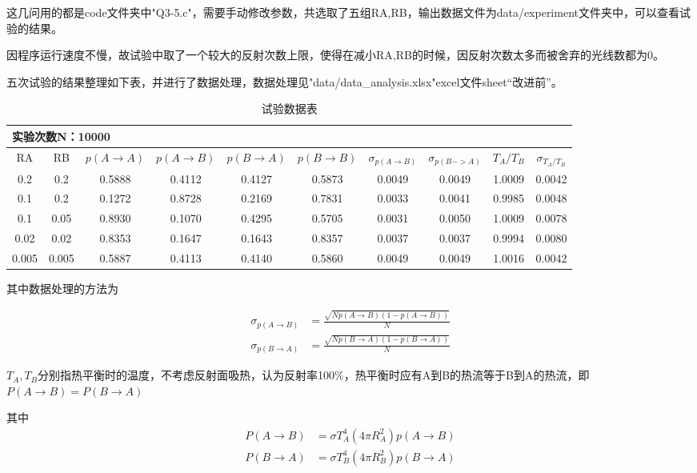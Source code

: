 \documentclass[10pt, a4paper]{article}
\begin{document}
    这几问用的都是code文件夹中"Q3-5.c"，需要手动修改参数，共选取了五组RA,RB，输出数据文件为data/experiment文件夹中，可以查看试验的结果。

    因程序运行速度不慢，故试验中取了一个较大的反射次数上限，使得在减小RA,RB的时候，因反射次数太多而被舍弃的光线数都为0。

    五次试验的结果整理如下表，并进行了数据处理，数据处理见"data/data_analysis.xlsx"excel文件sheet“改进前”。

    \begin{table}[H]
        \centering
        \caption{试验数据表}
        \begin{tabular}{|c|c|c|c|c|c|c|c|c|c|}\hline
        \multicolumn{10}{|l|}{实验次数N：10000} \\\hline
        RA    & RB    & $p(A\to A)$ & $p(A\to B)$ & $p(B\to A)$ &$ p(B\to B)$ & $\sigma _{p(A\to B)}$ &$ \sigma _{p(B->A)}$ & $T_A/T_B$ & $\sigma_{T_A/T_B} $\\\hline
        0.2   & 0.2   & 0.5888 & 0.4112 & 0.4127 & 0.5873 & 0.0049 & 0.0049 & 1.0009 & 0.0042 \\\hline
        0.1   & 0.2   & 0.1272 & 0.8728 & 0.2169 & 0.7831 & 0.0033 & 0.0041 & 0.9985 & 0.0048 \\\hline
        0.1   & 0.05  & 0.8930 & 0.1070 & 0.4295 & 0.5705 & 0.0031 & 0.0050 & 1.0009 & 0.0078 \\\hline
        0.02  & 0.02  & 0.8353 & 0.1647 & 0.1643 & 0.8357 & 0.0037 & 0.0037 & 0.9994 & 0.0080 \\\hline
        0.005 & 0.005 & 0.5887 & 0.4113 & 0.4140 & 0.5860 & 0.0049 & 0.0049 & 1.0016 & 0.0042 \\\hline
        \end{tabular}%
        \label{tab:试验数据表}%
    \end{table}%
  
    其中数据处理的方法为

    \begin{align*}
        \sigma_{p(A\to B)}&=\frac{\sqrt{Np(A\to B)(1-p(A\to B))}}{N}\\
        \sigma_{p(B\to A)}&=\frac{\sqrt{Np(B\to A)(1-p(B\to A))}}{N}
    \end{align*}

    $T_A,T_B$分别指热平衡时的温度，不考虑反射面吸热，认为反射率100$\%$，热平衡时应有A到B的热流等于B到A的热流，即$P(A\to B)=P(B\to A)$

    其中
    \begin{align*}
        P(A\to B)&=\sigma T_A^4(4\pi R_A^2)p(A\to B)\\
        P(B\to A)&=\sigma T_B^4(4\pi R_B^2)p(B\to A)
    \end{align*}
\end{document}
